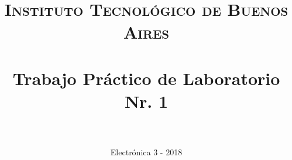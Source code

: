 

\title{
	\normalfont \normalsize \textsc{Instituto Tecnológico de Buenos Aires} \\ [25pt]
	\horrule{2pt} \\[0.4cm]
	\huge Trabajo Práctico de Laboratorio Nr. 1 \\
	\horrule{2pt} \\[0cm]
}
\author{
	\normalfont \normalsize
	Electrónica 3 - 2018 \\[0pt]		\normalsize
}
\date{}




\maketitle










